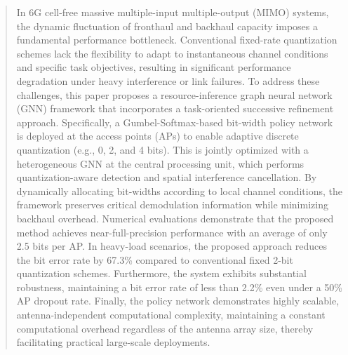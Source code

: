 \begin{abstract}
In 6G cell-free massive multiple-input multiple-output (MIMO) systems, the dynamic fluctuation of fronthaul and backhaul capacity imposes a fundamental performance bottleneck. Conventional fixed-rate quantization schemes lack the flexibility to adapt to instantaneous channel conditions and specific task objectives, resulting in significant performance degradation under heavy interference or link failures. To address these challenges, this paper proposes a resource-inference graph neural network (GNN) framework that incorporates a task-oriented successive refinement approach. Specifically, a Gumbel-Softmax-based bit-width policy network is deployed at the access points (APs) to enable adaptive discrete quantization (e.g., 0, 2, and 4 bits). This is jointly optimized with a heterogeneous GNN at the central processing unit, which performs quantization-aware detection and spatial interference cancellation. By dynamically allocating bit-widths according to local channel conditions, the framework preserves critical demodulation information while minimizing backhaul overhead. Numerical evaluations demonstrate that the proposed method achieves near-full-precision performance with an average of only 2.5 bits per AP. In heavy-load scenarios, the proposed approach reduces the bit error rate by 67.3\% compared to conventional fixed 2-bit quantization schemes. Furthermore, the system exhibits substantial robustness, maintaining a bit error rate of less than 2.2\% even under a 50\% AP dropout rate. Finally, the policy network demonstrates highly scalable, antenna-independent computational complexity, maintaining a constant computational overhead regardless of the antenna array size, thereby facilitating practical large-scale deployments.
\end{abstract}